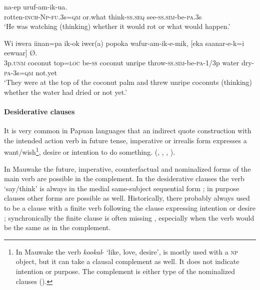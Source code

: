 \ea%
\label{ex:8:x1591}
\gll [Beel-al-i-non=i  kamenion]  na-ep uruf-am-ik-ua.\\
rotten-\textsc{inch}-\textsc{Np}-\textsc{fu}.3s=\textsc{qm} or.what  think-\textsc{ss}.\textsc{seq} see-\textsc{ss}.\textsc{sim}-be-\textsc{pa}.3s\\
\glt`He was watching (thinking) whether it would rot or what would happen.'
\z


\ea%
\label{ex:8:x1593}
\gll Wi  iwera  iinan=pa  ik-ok  iwer(a)  popoka wafur-am-ik-e-mik,  [eka  saanar-e-k=i  eewuar] {\O}. \\
3p.\textsc{unm} coconut top=\textsc{loc} be-\textsc{ss} coconut unripe throw-\textsc{ss}.\textsc{sim}-be-\textsc{pa}-1/3p water dry-\textsc{pa}-3s=\textsc{qm} not.yet\\
\glt`They were at the top of the coconut palm and threw unripe coconuts (thinking) whether the water had dried or not yet.'
\z


\paragraph[Desiderative clauses]{Desiderative clauses}\label{sec:8.3.2.1.3}

It is very common in Papuan languages that an indirect quote construction with the intended action verb in future tense, imperative or irrealis form expresses a want/wish\footnote{In Mauwake the verb \textit{kookal}- `like, love, desire', is mostly used with a \textsc{np} object, but it can take a clausal complement as well. It does not indicate intention or purpose. The complement is either type of the nominalized clauses ().}, desire or intention to do something. (\citealt[254--259]{Reesink1987}, \citealt[157]{Foley1986}, \citealt[112]{Hardin2003}, \citealt[76--77]{Hepner2002}).

In Mauwake the future, imperative, counterfactual and nominalized forms of the main verb are possible in the complement. In the desiderative clauses the verb  `say/think' is always in the medial same-subject sequential form ; in purpose clauses other forms are possible as well. Historically, there probably always used to be a clause with a finite verb following the clause expressing intention or desire ; synchronically the finite clause is often missing , especially when the verb would be the same as in the complement.

